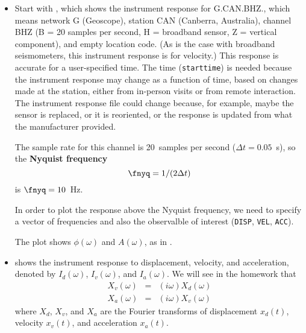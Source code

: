 \documentclass[11pt,titlepage,fleqn]{article}
\begin{document}
\begin{itemize}
\item Start with , which shows the instrument response for G.CAN.BHZ., which means network G (Geoscope), station CAN (Canberra, Australia), channel BHZ (B = 20 samples per second, H = broadband sensor, Z = vertical component), and empty location code. (As is the case with broadband seismometers, this instrument response is for velocity.) This response is accurate for a user-specified time. The time (\verb+starttime+) is needed because the instrument response may change as a function of time, based on changes made at the station, either from in-person visits or from remote interaction. The instrument response file could change because, for example, maybe the sensor is replaced, or it is reoriented, or the response is updated from what the manufacturer provided.
%
%

The sample rate for this channel is 20~samples per second ($\Delta t = 0.05$~s), so the {\bf Nyquist frequency}
%
\begin{equation}
\fnyq = 1/(2\Delta t)
\end{equation}
%
is $\fnyq = 10$~Hz.

In order to plot the response above the Nyquist frequency, we need to specify a vector of frequencies and also the observalble of interest (\verb+DISP+, \verb+VEL+, \verb+ACC+).

The plot shows $\phi(\omega)$ and $A(\omega)$, as in .


\item {} shows the instrument response to displacement, velocity, and acceleration, denoted by $I_d(\omega)$, $I_v(\omega)$, and $I_a(\omega)$. We will see in the homework that 
%
\begin{eqnarray*}
X_v(\omega) &=& (i\omega) X_d(\omega)
\\
X_a(\omega) &=& (i\omega) X_v(\omega)
\end{eqnarray*}
%
where $X_d$, $X_v$, and $X_a$ are the Fourier transforms of displacement $x_d(t)$, velocity $x_v(t)$, and acceleration $x_a(t)$.


\end{itemize}
\end{document}

